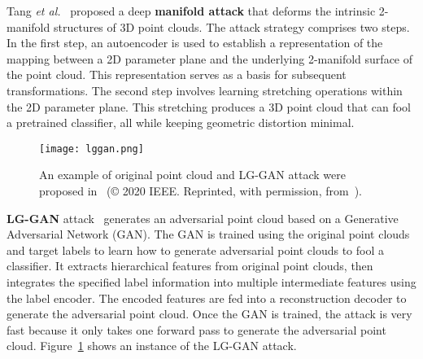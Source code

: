 \documentclass{ieeeaccess}
\def\etal{\textit{et al.}}
\begin{document}
Tang \etal~\cite{tang2023deep} proposed a deep \textbf{manifold attack} that deforms the intrinsic 2-manifold structures of 3D point clouds. The attack strategy comprises two steps. In the first step, an autoencoder is used to establish a representation of the mapping between a 2D parameter plane and the underlying 2-manifold surface of the point cloud. This representation serves as a basis for subsequent transformations. The second step involves learning stretching operations within the 2D parameter plane. This stretching produces a 3D point cloud that can fool a pretrained classifier, all while keeping geometric distortion minimal.

\begin{figure}
    \centering
    \texttt{[image: lggan.png]}
    \caption{An example of original point cloud and LG-GAN attack were proposed in~\cite{zhou2020lg} (© 2020 IEEE. Reprinted, with permission, from~\cite{zhou2020lg}).}
    \label{fig_lggan}
\end{figure}


\textbf{LG-GAN} attack~\cite{zhou2020lg} generates an adversarial point cloud based on a Generative Adversarial Network (GAN). The GAN is trained using the original point clouds and target labels to learn how to generate adversarial point clouds to fool a classifier. It extracts hierarchical features from original point clouds, %
then integrates the specified label information into multiple intermediate features using the label encoder. The encoded features are fed into a reconstruction decoder to generate the adversarial point cloud. Once the GAN is trained, the attack is very fast because it only takes one forward pass to generate the adversarial point cloud. Figure~\ref{fig_lggan} shows an instance of the LG-GAN attack.
\end{document}
